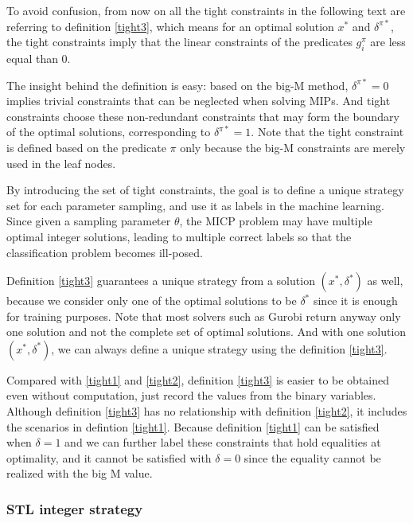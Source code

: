 \documentclass[a4paper]{report}
\begin{document}
To avoid confusion, from now on all the tight constraints in the following text are referring to definition \ref*{tight3}, which means for an optimal solution $x^*$ and $\delta^{\pi*}$, the tight constraints imply that the linear constraints of the predicates $g_i^{\pi}$ are less equal than 0.

The insight behind the definition is easy: based on the big-M method, $\delta^{\pi*}=0$ implies trivial constraints that can be neglected when solving MIPs. And tight constraints choose these non-redundant constraints that may form the boundary of the optimal solutions, corresponding to $\delta^{\pi*}=1$. Note that the tight constraint is defined based on the predicate $\pi$ only because the big-M constraints are merely used in the leaf nodes.

By introducing the set of tight constraints, the goal is to define a unique strategy set for each parameter sampling, and use it as labels in the machine learning. Since given a sampling parameter $\theta$, the MICP problem may have multiple optimal integer solutions, leading to multiple correct labels so that the classification problem becomes ill-posed.

Definition \ref{tight3} guarantees a unique strategy from a solution $(x^*,\delta^*)$ as well, because we consider only one of the optimal solutions to be $\delta^*$ since it is enough for training purposes. Note that most solvers such as Gurobi return anyway only one solution and not the complete set of optimal solutions. And with one solution $(x^*,\delta^*)$, we can always define a unique strategy using the definition \ref{tight3}.

Compared with \ref*{tight1} and \ref*{tight2}, definition \ref{tight3} is easier to be obtained even without computation, just record the values from the binary variables. Although definition \ref*{tight3} has no relationship with definition \ref*{tight2}, it includes the scenarios in defintion \ref*{tight1}. Because definition \ref*{tight1} can be satisfied when $\delta = 1$ and we can further label these constraints that hold equalities at optimality, and it cannot be satisfied with $\delta = 0$ since the equality cannot be realized with the big M value.

 
\subsubsection*{STL integer strategy}  
\end{document}
